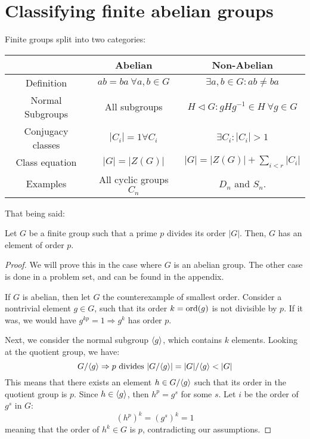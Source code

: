 
\section{Classifying finite abelian groups}

Finite groups split into two categories:
\begin{center}
  \begin{tabular}{ c | c | c }
               & Abelian & Non-Abelian \\ \hline
    Definition & $ab = ba \ \forall a, b \in G$ & $\exists a, b \in G: ab \neq ba$ \\
    Normal Subgroups & All subgroups & $H \mathrel{\triangleleft} G : gHg^{-1} \in H \ \forall g \in G$ \\
    Conjugacy classes & $|C_i| = 1 \forall C_i$ & $\exists C_i: |C_i| > 1$ \\
    Class equation & $|G| = |Z(G)|$ & $|G| = |Z(G)| + \sum_{i < r} |C_i|$ \\
    Examples & All cyclic groups $C_n$ & $D_n$ and $S_n$. 
  \end{tabular}  
\end{center}
That being said: 
\begin{theorem}[Cauchy]\label{cauchy}
  Let $G$ be a finite group such that a prime $p$ divides its order $|G|$. Then, $G$ has an element of order $p$. 
\end{theorem}
\begin{proof}
  We will prove this in the case where $G$ is an abelian group. The other case is done in a problem set, and can be found in the appendix. 
  
  If $G$ is abelian, then let $G$ the counterexample of smallest order. Consider a nontrivial element $g \in G$, such that its order $k = \operatorname{ord}(g)$ is not divisible by $p$. If it was, we would have $g^{kp} = 1 \Rightarrow g^k$ has order $p$. 
  
  Next, we consider the normal subgroup $\langle g \rangle$, which contains $k$ elements. Looking at the quotient group, we have: 
  \[
    G/\langle g \rangle \Rightarrow p \text{ divides } |G/\langle g \rangle| = |G|/\langle g \rangle < |G| 
  \]
  This means that there exists an element $h \in G/\langle g \rangle$ such that its order in the quotient group is $p$. Since $h \in \langle g \rangle$, then $h^p = g^s$ for some $s$. Let $i$ be the order of $g^s$ in $G$: 
  \[
    (h^p)^k = (g^s)^k = 1
  \]
  meaning that the order of $h^k \in G$ is $p$, contradicting our assumptions. 
\end{proof}

